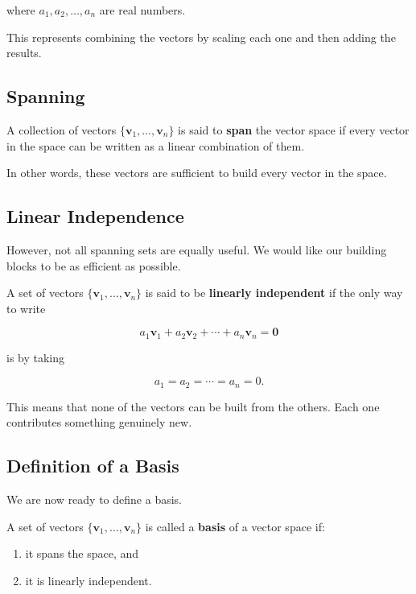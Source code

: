 \documentclass[11pt,openany]{book}
\theoremstyle{definition}
\begin{document}
where $a_1, a_2, \dots, a_n$ are real numbers.

This represents combining the vectors by scaling each one and then adding the results.

\medskip

\subsection{Spanning}

A collection of vectors $\{\mathbf{v}_1, \dots, \mathbf{v}_n\}$ is said to \textbf{span} the vector space
if every vector in the space can be written as a linear combination of them.

In other words, these vectors are sufficient to build every vector in the space.

\medskip

\subsection{Linear Independence}

However, not all spanning sets are equally useful.
We would like our building blocks to be as efficient as possible.

A set of vectors $\{\mathbf{v}_1, \dots, \mathbf{v}_n\}$ is said to be \textbf{linearly independent}
if the only way to write

\[
a_1 \mathbf{v}_1 + a_2 \mathbf{v}_2 + \cdots + a_n \mathbf{v}_n = \mathbf{0}
\]

is by taking

\[
a_1 = a_2 = \cdots = a_n = 0.
\]

This means that none of the vectors can be built from the others.
Each one contributes something genuinely new.

\medskip

\subsection{Definition of a Basis}

We are now ready to define a basis.

A set of vectors $\{\mathbf{v}_1, \dots, \mathbf{v}_n\}$ is called a \textbf{basis} of a vector space if:

\begin{enumerate}
  \item it spans the space, and
  \item it is linearly independent.
\end{enumerate}
\end{document}
